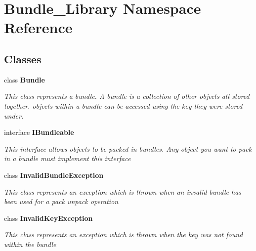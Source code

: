 \section{Bundle\+\_\+\+Library Namespace Reference}
\label{namespace_bundle___library}
\subsection*{Classes}
\begin{DoxyCompactItemize}
\item 
class {\bf Bundle}
\begin{DoxyCompactList}\small\item\em This class represents a bundle. A bundle is a collection of other objects all stored together. objects within a bundle can be accessed using the key they were stored under. \end{DoxyCompactList}\item 
interface {\bf I\+Bundleable}
\begin{DoxyCompactList}\small\item\em This interface allows objects to be packed in bundles. Any object you want to pack in a bundle must implement this interface \end{DoxyCompactList}\item 
class {\bf Invalid\+Bundle\+Exception}
\begin{DoxyCompactList}\small\item\em This class represents an exception which is thrown when an invalid bundle has been used for a pack unpack operation \end{DoxyCompactList}\item 
class {\bf Invalid\+Key\+Exception}
\begin{DoxyCompactList}\small\item\em This class represents an exception which is thrown when the key was not found within the bundle \end{DoxyCompactList}\end{DoxyCompactItemize}
